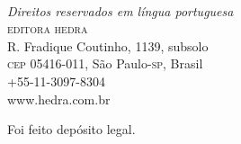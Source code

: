 \begin{center}
\fontsize{9pt}{\baselineskip}\selectfont
[\the\year]\\
\textit{Direitos reservados em língua portuguesa}\\
\textsc{editora hedra}\\
R. Fradique Coutinho, 1139, subsolo\\
\textsc{cep} 05416-011,  São Paulo-\textsc{sp}, Brasil\\
+55-11-3097-8304\\ 
www.hedra.com.br\\\smallskip

Foi feito depósito legal.

\end{center}
\endgroup
